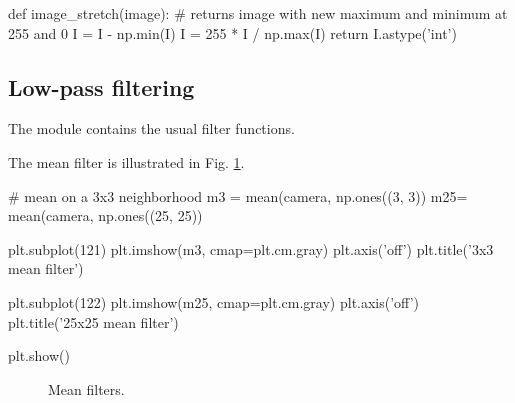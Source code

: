 \begin{python}
def image_stretch(image):
    # returns image with new maximum and minimum at 255 and 0
    I = I - np.min(I)
    I = 255 * I / np.max(I)
    return I.astype('int')
\end{python}


\subsection{Low-pass filtering}
\begin{pcomment}
\begin{premark}The module  contains the usual filter functions. 
\end{premark}
\end{pcomment}
The mean filter is illustrated in Fig. \ref{fig:introduction:python:mean}.

\begin{python}
# mean on a 3x3 neighborhood
m3 = mean(camera, np.ones((3, 3))
m25= mean(camera, np.ones((25, 25))

plt.subplot(121)
plt.imshow(m3, cmap=plt.cm.gray)
plt.axis('off')
plt.title('3x3 mean filter')

plt.subplot(122)
plt.imshow(m25, cmap=plt.cm.gray)
plt.axis('off')
plt.title('25x25 mean filter')

plt.show()
\end{python}

\begin{figure}[H]
 \centering\caption{Mean filters.}
 \hspace{1cm}
 \label{fig:introduction:python:mean}%
\end{figure}


